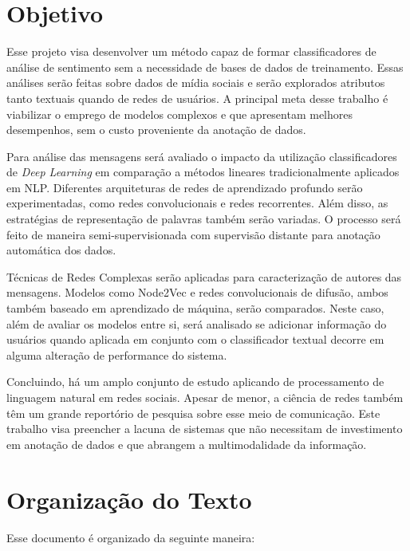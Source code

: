 \section{Objetivo}

Esse projeto visa desenvolver um método capaz de formar classificadores de
análise de sentimento sem a necessidade de bases de dados de treinamento.
Essas análises serão feitas sobre dados de mídia sociais e serão explorados
atributos tanto textuais quando de redes de usuários.
A principal meta desse trabalho é viabilizar o emprego de modelos complexos e
que apresentam melhores desempenhos, sem o custo proveniente da anotação de
dados.

Para análise das mensagens será avaliado o impacto da utilização classificadores
de \textit{Deep Learning} em comparação a métodos lineares tradicionalmente
aplicados em NLP.
Diferentes arquiteturas de redes de aprendizado profundo serão experimentadas,
como redes convolucionais e redes recorrentes.
Além disso, as estratégias de representação de palavras também serão variadas.
O processo será feito de maneira semi-supervisionada com supervisão distante
para anotação automática dos dados.

Técnicas de Redes Complexas serão aplicadas para caracterização de autores das
mensagens.
Modelos como Node2Vec e redes convolucionais de difusão, ambos também baseado em
aprendizado de máquina, serão comparados.
Neste caso, além de avaliar os modelos entre si, será analisado se adicionar
informação do usuários quando aplicada em conjunto com o classificador textual
decorre em alguma alteração de performance do sistema.

Concluindo, há um amplo conjunto de estudo aplicando de processamento de
linguagem natural em redes sociais.
Apesar de menor, a ciência de redes também têm um grande reportório de pesquisa
sobre esse meio de comunicação.
Este trabalho visa preencher a lacuna de sistemas que não necessitam de
investimento em anotação de dados e que abrangem a multimodalidade da
informação.

\section{Organização do Texto}

Esse documento é organizado da seguinte maneira:

